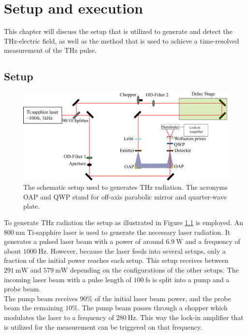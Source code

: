\chapter{Setup and execution}
This chapter will discuss the setup that is utilized to generate and detect the $\si{\tera\hertz}$-electric field, as well as the method that is used to achieve a time-resolved measurement of the $\si{\tera\hertz}$ pulse.

\section{Setup}
\label{sec:setup}
\begin{figure}
    \centering
    \includegraphics[width=\textwidth]{Plots/Aufbau.pdf}
    \caption{The schematic setup used to generates $\si{\tera\hertz}$ radiation.
    The acronyms OAP and QWP stand for off-axis parabolic mirror and quarter-wave plate. }
    \label{fig:setup}
\end{figure}
To generate $\si{\tera\hertz}$ radiation the setup as illustrated in Figure \ref{fig:setup} is employed.
An $\SI{800}{\nano\meter}$ Ti-sapphire laser is used to generate the necessary laser radiation.
It generates a pulsed laser beam with a power of around $\SI{6.9}{\W}$ and a frequency of about $\SI{1000}{\Hz}$.
However, because the laser feeds into several setups, only a fraction of the initial power reaches each setup.
This setup receives between $\SI{291}{\milli\W}$ and $\SI{579}{\milli\W}$ depending on the configurations of the other setups. 
The incoming laser beam with a pulse length of $\SI{100}{\femto\second}$ is split into a pump and a probe beam.
\\
The pump beam receives $90\%$ of the initial laser beam power, and the probe beam the remaining $10\%$.
The pump beam passes through a chopper which modulates the laser to a frequency of $\SI{280}{\hertz}$.
This way the lock-in amplifier that is utilized for the measurement can be triggered on that frequency.
